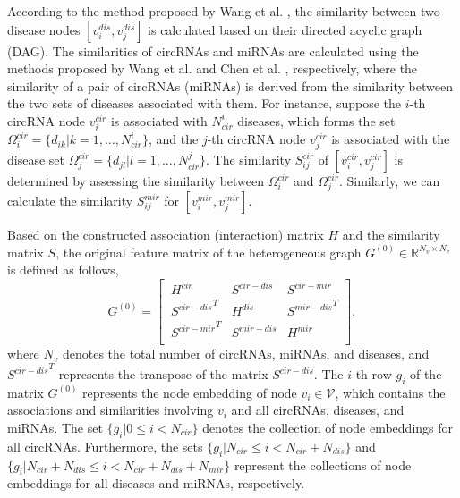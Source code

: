 \documentclass{bioinfo}
\begin{document}
\begin{methods}
According to the method proposed by Wang et al. \cite{wang2010inferring}, the similarity between two disease nodes $[v_i^{dis},v_j^{dis}]$ is calculated based on their directed acyclic graph (DAG). The similarities of circRNAs and miRNAs are calculated using the methods proposed by Wang et al. \cite{wang2010inferring} and Chen et al. \cite{chen2015constructing}, respectively, where the similarity of a pair of circRNAs (miRNAs) is derived from the similarity between the two sets of diseases associated with them. For instance, suppose the $i$-th circRNA node $v_i^{cir}$ is associated with $N_{cir}^i$ diseases, which forms the set $\Omega_i^{cir} = \{d_{ik} | k = 1, \ldots, N_{cir}^i\}$, and the $j$-th circRNA node $v_j^{cir}$ is associated with the disease set $\Omega_j^{cir} = \{d_{jl} | l = 1, \ldots, N_{cir}^j\}$. The similarity $S_{ij}^{cir}$ of $[v_i^{cir},v_j^{cir}]$ is determined by assessing the similarity between $\Omega_i^{cir}$ and $\Omega_j^{cir}$. Similarly, we can calculate the similarity $S_{ij}^{mir}$ for $[v_i^{mir},v_j^{mir}]$.

Based on the constructed association (interaction) matrix $H$ and the similarity matrix $S$, the original feature matrix of the heterogeneous graph $G^{(0)} \in \mathbb{R}^{N_v\times N_v}$ is defined as follows,
\begin{equation}
G^{(0)} = \left[\ \begin{array}{lll}
H^{cir} & S^{cir-dis} & S^{cir-mir}\\
{S^{cir-dis}}^T & H^{dis} & {S^{mir-dis}}^T\\
{S^{cir-mir}}^T & S^{mir-dis} & H^{mir}\\
\end{array} \right],
\end{equation}
where $N_v$ denotes the total number of circRNAs, miRNAs, and diseases, and ${S^{cir-dis}}^T$ represents the transpose of the matrix $S^{cir-dis}$. The $i$-th row $g_i$ of the matrix $G^{(0)}$ represents the node embedding of node $v_i \in \mathcal{V}$, which contains the associations and similarities involving $v_i$ and all circRNAs, diseases, and miRNAs. The set $\{g_i | 0 \leqslant i < N_{cir}\}$ denotes the collection of node embeddings for all circRNAs. Furthermore, the sets $\{g_i | N_{cir} \leqslant i < N_{cir} + N_{dis}\}$ and $\{g_i | N_{cir} + N_{dis} \leqslant i < N_{cir} + N_{dis} + N_{mir}\}$ represent the collections of node embeddings for all diseases and miRNAs, respectively.

\vspace{0.3cm}



\end{methods}
\end{document}
